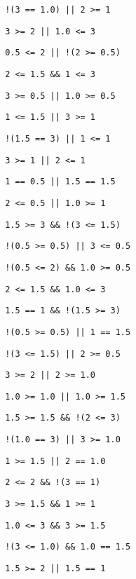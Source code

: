 \begin{exercise}
\begin{sltasks}[resume=true]
\begin{items}
    \item \texttt{ !(3 == 1.0) || 2 >= 1 }
    \item \texttt{ 3 >= 2 || 1.0 <= 3 }
  \end{items}
  \task
  \begin{items}
    \item \texttt{ 0.5 <= 2 || !(2 >= 0.5) }
    \item \texttt{ 2 <= 1.5 \&\& 1 <= 3 }
    \item \texttt{ 3 >= 0.5 || 1.0 >= 0.5 }
    \item \texttt{ 1 <= 1.5 || 3 >= 1 }
    \item \texttt{ !(1.5 == 3) || 1 <= 1 }
  \end{items}
  \task
  \begin{items}
    \item \texttt{ 3 >= 1 || 2 <= 1 }
    \item \texttt{ 1 == 0.5 || 1.5 == 1.5 }
    \item \texttt{ 2 <= 0.5 || 1.0 >= 1 }
    \item \texttt{ 1.5 >= 3 \&\& !(3 <= 1.5) }
    \item \texttt{ !(0.5 >= 0.5) || 3 <= 0.5 }
  \end{items}
  \task
  \begin{items}
    \item \texttt{ !(0.5 <= 2) \&\& 1.0 >= 0.5 }
    \item \texttt{ 2 <= 1.5 \&\& 1.0 <= 3 }
    \item \texttt{ 1.5 == 1 \&\& !(1.5 >= 3) }
    \item \texttt{ !(0.5 >= 0.5) || 1 == 1.5 }
    \item \texttt{ !(3 <= 1.5) || 2 >= 0.5 }
  \end{items}
  \task
  \begin{items}
    \item \texttt{ 3 >= 2 || 2 >= 1.0 }
    \item \texttt{ 1.0 >= 1.0 || 1.0 >= 1.5 }
    \item \texttt{ 1.5 >= 1.5 \&\& !(2 <= 3) }
    \item \texttt{ !(1.0 == 3) || 3 >= 1.0 }
    \item \texttt{ 1 >= 1.5 || 2 == 1.0 }
  \end{items}
  \task
  \begin{items}
    \item \texttt{ 2 <= 2 \&\& !(3 == 1) }
    \item \texttt{ 3 >= 1.5 \&\& 1 >= 1 }
    \item \texttt{ 1.0 <= 3 \&\& 3 >= 1.5 }
    \item \texttt{ !(3 <= 1.0) \&\& 1.0 == 1.5 }
    \item \texttt{ 1.5 >= 2 || 1.5 == 1 }
  \end{items}
\end{sltasks}
\end{exercise}

